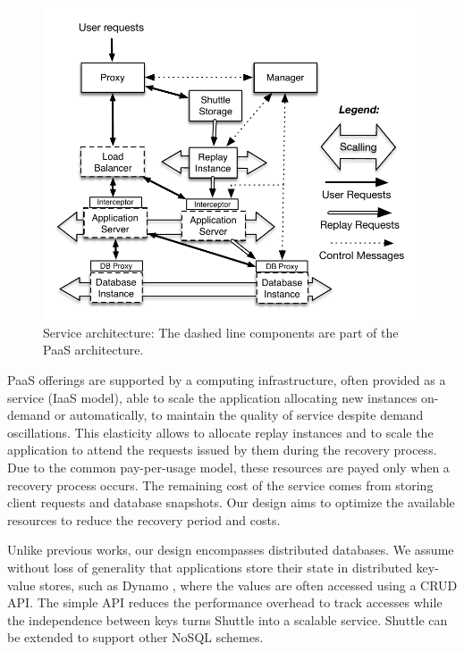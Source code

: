 \begin{figure}
  \centering
  \includegraphics[width=0.8\columnwidth]{images/architectureTiers}
  \caption{Service architecture: The dashed line components are part of the \ac{PaaS} architecture. %
  }
  \label{fig:shuttle_architecture}
\end{figure}

PaaS offerings are supported by a computing infrastructure, often provided as a service (IaaS model), able to scale the application allocating new instances on-demand or automatically, to maintain the quality of service despite demand oscillations. This elasticity  allows to allocate replay instances and to scale the application to attend the requests issued by them during the recovery process.
Due to the common pay-per-usage model, these resources are payed only when a recovery process occurs. The remaining cost of the service comes from storing client requests and database snapshots. Our design aims to optimize the available resources to reduce the recovery period and costs. 




Unlike previous works, our design encompasses distributed databases. We assume without loss of generality that applications store their state in distributed key-value stores, such as Dynamo \cite{Decandia2007}, where the values are often accessed using a \acf{CRUD} API. The simple API reduces the performance overhead to track accesses while the independence between keys turns Shuttle into a scalable service. Shuttle can be extended to support other NoSQL schemes.

